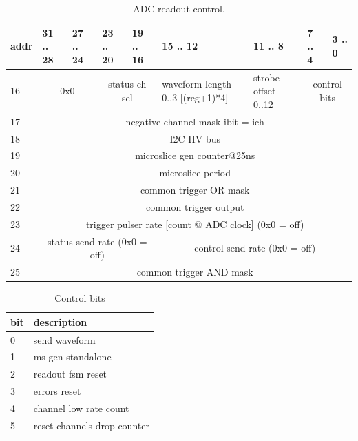 \documentclass{article}
\begin{document}
\begin{table}[H]
\centering
\begin{tabular}{| l | l | l | l | l | l | l | l | l |}
\hline
addr & 31 .. 28 & 27 .. 24 & 23 .. 20 & 19 .. 16 & 15 .. 12 & 11 .. 8 & 7 .. 4 & 3 .. 0 \\ \hline
16 & \multicolumn{2}{c|}{0x0} & \multicolumn{2}{c|}{status ch sel} & waveform length 0..3 [(reg+1)*4] & strobe offset 0..12 & \multicolumn{2}{c|}{control bits} \\ \hline
17 & \multicolumn{8}{c|}{negative channel mask ibit = ich} \\ \hline
18 & \multicolumn{8}{c|}{I2C HV bus} \\ \hline
19 & \multicolumn{8}{c|}{microslice gen counter@25ns} \\ \hline
20 & \multicolumn{8}{c|}{microslice period} \\ \hline
21 & \multicolumn{8}{c|}{common trigger OR mask} \\ \hline
22 & \multicolumn{8}{c|}{common trigger output} \\ \hline
23 & \multicolumn{8}{c|}{trigger pulser rate [count @ ADC clock] (0x0 = off)} \\ \hline
24 & \multicolumn{4}{c|}{status send rate (0x0 = off)}& \multicolumn{4}{c|}{control send rate (0x0 = off)} \\ \hline
25 & \multicolumn{8}{c|}{common trigger AND mask} \\
\hline
\end{tabular}
\caption{ADC readout control.}
\end{table}

\begin{table}[H]
\centering
\begin{tabular}{| l | l |}
\hline
bit & description \\ \hline
0 & send waveform \\ \hline
1 & ms gen standalone \\ \hline
2 & readout fsm reset \\ \hline
3 & errors reset \\ \hline
4 & channel low rate count \\ \hline
5 & reset channels drop counter \\ \hline
\end{tabular}
\caption{Control bits\label{tab6}}
\end{table}
\end{document}
